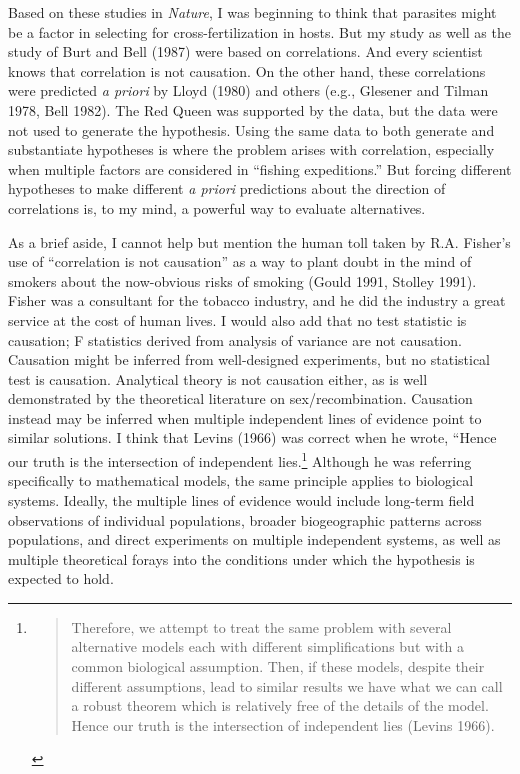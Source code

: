 \documentclass[
  letterpaper,
]{book}
\begin{document}
Based on these studies in \emph{Nature}, I was beginning to think that
parasites might be a factor in selecting for cross-fertilization in
hosts. But my study as well as the study of Burt and Bell (1987) were
based on correlations. And every scientist knows that correlation is not
causation. On the other hand, these correlations were predicted \emph{a
priori} by Lloyd (1980) and others (e.g., Glesener and Tilman 1978, Bell
1982). The Red Queen was supported by the data, but the data were not
used to generate the hypothesis. Using the same data to both generate
and substantiate hypotheses is where the problem arises with
correlation, especially when multiple factors are considered in
``fishing expeditions.'' But forcing different hypotheses to make
different \emph{a priori} predictions about the direction of
correlations is, to my mind, a powerful way to evaluate alternatives.

As a brief aside, I cannot help but mention the human toll taken by R.A.
Fisher's use of ``correlation is not causation'' as a way to plant doubt
in the mind of smokers about the now-obvious risks of smoking (Gould
1991, Stolley 1991). Fisher was a consultant for the tobacco industry,
and he did the industry a great service at the cost of human lives. I
would also add that no test statistic is causation; F statistics derived
from analysis of variance are not causation. Causation might be inferred
from well-designed experiments, but no statistical test is causation.
Analytical theory is not causation either, as is well demonstrated by
the theoretical literature on sex/recombination. Causation instead may
be inferred when multiple independent lines of evidence point to similar
solutions. I think that Levins (1966) was correct when he wrote, ``Hence
our truth is the intersection of independent lies.\footnote{\begin{quote}
  Therefore, we attempt to treat the same problem with several
  alternative models each with different simplifications but with a
  common biological assumption. Then, if these models, despite their
  different assumptions, lead to similar results we have what we can
  call a robust theorem which is relatively free of the details of the
  model. Hence our truth is the intersection of independent lies (Levins
  1966).
  \end{quote}} Although he was referring specifically to mathematical
models, the same principle applies to biological systems. Ideally, the
multiple lines of evidence would include long-term field observations of
individual populations, broader biogeographic patterns across
populations, and direct experiments on multiple independent systems, as
well as multiple theoretical forays into the conditions under which the
hypothesis is expected to hold.
\end{document}
